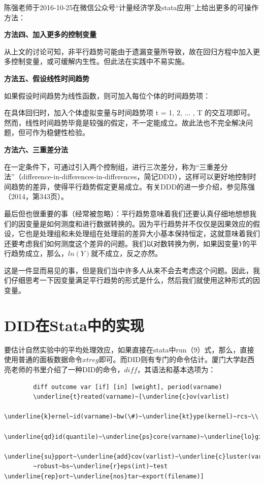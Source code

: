 \documentclass[cn,12pt,math=newtx,citestyle=gb7714-2015,bibstyle=gb7714-2015]{elegantbook}
\begin{document}
	陈强老师于2016-10-25在微信公众号“计量经济学及stata应用”上给出更多的可操作方法：
	
	\textbf{方法四、加入更多的控制变量}
	
	从上文的讨论可知，非平行趋势可能由于遗漏变量所导致，故在回归方程中加入更多控制变量，或可缓解内生性。但此法在实践中不易实施。
	
	\textbf{方法五、假设线性时间趋势}
	
	如果假设时间趋势为线性函数，则可加入每位个体的时间趋势项：
	
	在具体回归时，加入个体虚拟变量与时间趋势项 t = 1, 2, ... , T 的交互项即可。然而，线性时间趋势毕竟是较强的假定，不一定能成立。故此法也不完全解决问题，但可作为稳健性检验。
	
	\textbf{方法六、三重差分法}
	
	在一定条件下，可通过引入两个控制组，进行三次差分，称为“三重差分法”（difference-in-differences-in-differences，简记DDD），这样可以更好地控制时间趋势的差异，使得平行趋势假定更易成立。有关DDD的进一步介绍，参见陈强（2014，第343页）。
	
	最后但也很重要的事（经常被忽略）：平行趋势意味着我们还要认真仔细地想想我们的因变量是如何测度和进行数据转换的。因为平行趋势并不仅仅是因果效应的假设，它也是处理组和未处理组在处理前的差异大小基本保持恒定，这就意味着我们还要考虑我们如何测度这个差异的问题。我们以对数转换为例，如果因变量$Y$的平行趋势成立，那么，$ln(Y)$就不成立，反之亦然。
	
	这是一件显而易见的事，但是我们当中许多人从来不会去考虑这个问题。因此，我们仔细思考一下因变量满足平行趋势的形式是什么，然后我们就使用这种形式的因变量。
	
	\section{DID在Stata中的实现}
	
	要估计自然实验中的平均处理效应，如果直接在stata中run（9）式，那么，直接使用普通的面板数据命令$xtreg$即可。而DID则有专门的命令估计。厦门大学赵西亮老师的书里介绍了一种DID的命令，$diff$，其语法和基本选项为：
	\begin{lstlisting}
		diff outcome var [if] [in] [weight], period(varname)
		\underline{t}reated(varname)~[\underline{c}ov(varlist)
		\underline{k}ernel~id(varname)~bw(\#)~\underline{kt}ype(kernel)~rcs~\\
		\underline{qd}id(quantile)~\underline{ps}core(varname)~\underline{lo}git~\\
		\underline{su}pport~\underline{add}cov(varlist)~\underline{c}luster(varname)\\
		~robust~bs~\underline{r}eps(int)~test \underline{rep}ort~\underline{nos}tar~export(filename)]
	\end{lstlisting}
	
\end{document}
